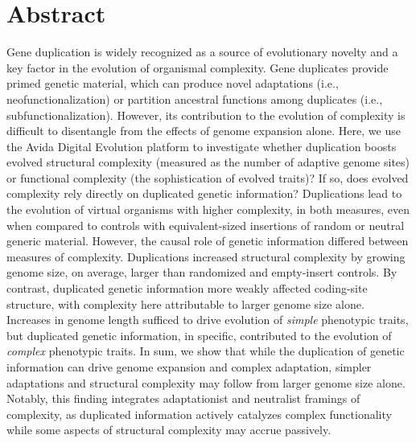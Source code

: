 \section*{Abstract}
Gene duplication is widely recognized as a source of evolutionary novelty and a key factor in the evolution of organismal complexity.
Gene duplicates provide primed genetic material, which can produce novel adaptations (i.e., neofunctionalization) or partition ancestral functions among duplicates (i.e., subfunctionalization).
However, %
its contribution to the evolution of complexity is difficult to disentangle from the effects of genome expansion alone.
Here, we use the Avida Digital Evolution platform to investigate whether duplication boosts evolved structural complexity (measured as the number of adaptive genome sites) or functional complexity (the sophistication of evolved traits)?
If so, does evolved complexity rely directly on duplicated genetic information?
Duplications lead to the evolution of virtual organisms with higher complexity, in both measures, even when compared to controls with equivalent-sized insertions of random or neutral generic material.
However, the causal role of genetic information differed between measures of complexity.
Duplications increased structural complexity by growing genome size, on average, larger than randomized and empty-insert controls.
By contrast, duplicated genetic information more weakly affected coding-site structure, with complexity here attributable to larger genome size alone.
Increases in genome length sufficed to drive evolution of \textit{simple} phenotypic traits, but duplicated genetic information, in specific, contributed to the evolution of \textit{complex} phenotypic traits.
In sum, we show that while the duplication of genetic information can drive genome expansion and complex adaptation, simpler adaptations and structural complexity may follow from larger genome size alone.
Notably, this finding integrates adaptationist and neutralist framings of complexity, as duplicated information actively catalyzes complex functionality while some aspects of structural complexity may accrue passively.

